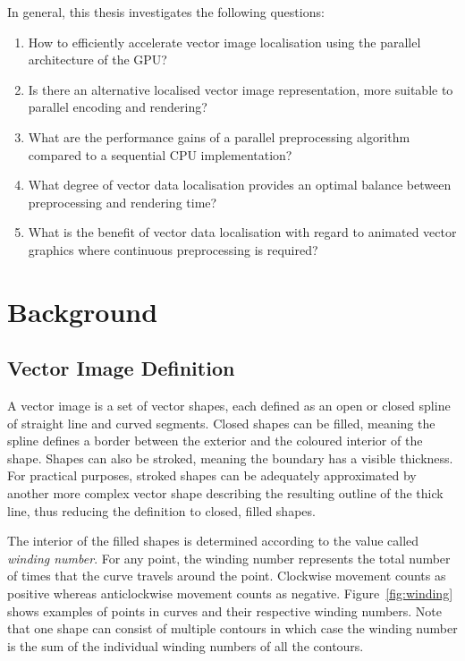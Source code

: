 \documentclass[11pt,a4paper,twoside]{article}
\begin{document}
In general, this thesis investigates the following questions:

\begin {enumerate}
\item
How to efficiently accelerate vector image localisation using the parallel architecture of the GPU?
\item
Is there an alternative localised vector image representation, more suitable to parallel encoding and rendering?
\item
What are the performance gains of a parallel preprocessing algorithm compared to a sequential CPU implementation?
\item
What degree of vector data localisation provides an optimal balance between preprocessing and rendering time?
\item
What is the benefit of vector data localisation with regard to animated vector graphics where continuous preprocessing is required?
\end {enumerate}

\section {Background}
\subsection {Vector Image Definition}

A vector image is a set of vector shapes, each defined as an open or closed spline of straight line and curved segments. Closed shapes can be filled, meaning the spline defines a border between the exterior and the coloured interior of the shape. Shapes can also be stroked, meaning the boundary has a visible thickness. For practical purposes, stroked shapes can be adequately approximated by another more complex vector shape describing the resulting outline of the thick line, thus reducing the definition to closed, filled shapes.

The interior of the filled shapes is determined according to the value called \emph{winding number}. For any point, the winding number represents the total number of times that the curve travels around the point. Clockwise movement counts as positive whereas anticlockwise movement counts as negative. Figure~\ref{fig:winding} shows examples of points in curves and their respective winding numbers. Note that one shape can consist of multiple contours in which case the winding number is the sum of the individual winding numbers of all the contours.
\end{document}
